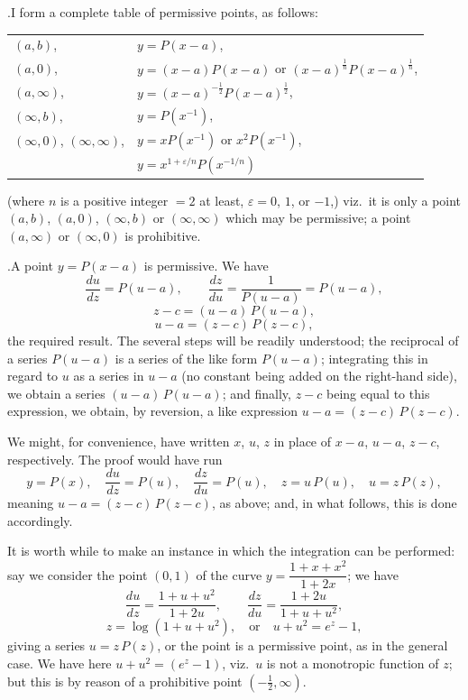 \documentclass[11pt]{article}
\begin{document}
\medskip

.\quad I form a complete table of permissive points, as follows:
\begin{center}
\begin{tabular}{ll}
$(a,b)$, & $y = P(x-a)$, \\
$(a,0)$, & $y = (x-a)P(x-a)$ or $(x-a)^{\frac{1}{n}}P(x-a)^{\frac{1}{n}}$, \\
$(a,\infty)$, & $y = (x-a)^{-\frac{1}{2}}P(x-a)^{\frac{1}{2}}$, \\
$(\infty,b)$, & $y = P(x^{-1})$, \\
$(\infty,0)$, $(\infty,\infty)$, & $y = xP(x^{-1})$ or $x^{2}P(x^{-1})$, \\
 & $y = x^{1+\varepsilon/n}P(x^{-1/n})$
\end{tabular}
\end{center}
\noindent (where $n$ is a positive integer $=2$ at least, $\varepsilon=0$, $1$, or $-1$,) viz.\ it is only a point $(a,b)$, $(a,0)$, $(\infty,b)$ or $(\infty,\infty)$ which may be permissive; a point $(a,\infty)$ or $(\infty,0)$ is prohibitive.

\medskip

.\quad A point $y = P(x-a)$ is permissive. We have
\[
\frac{du}{dz} = P(u-a), \qquad \frac{dz}{du} = \frac{1}{P(u-a)} = P(u-a),
\]
\[
z-c = (u-a)\,P(u-a),
\]
\[
u-a = (z-c)\,P(z-c),
\]
the required result. The several steps will be readily understood; the reciprocal of a series $P(u-a)$ is a series of the like form $P(u-a)$; integrating this in regard to $u$ as a series in $u-a$ (no constant being added on the right-hand side), we obtain a series $(u-a)\,P(u-a)$; and finally, $z-c$ being equal to this expression, we obtain, by reversion, a like expression $u-a = (z-c)\,P(z-c)$.

We might, for convenience, have written $x$, $u$, $z$ in place of $x-a$, $u-a$, $z-c$, respectively. The proof would have run
\[
y = P(x),\quad \frac{du}{dz} = P(u),\quad \frac{dz}{du} = P(u),\quad z = u\,P(u),\quad u = z\,P(z),
\]
meaning $u-a = (z-c)\,P(z-c)$, as above; and, in what follows, this is done accordingly.

It is worth while to make an instance in which the integration can be performed: say we consider the point $(0,1)$ of the curve $y = \dfrac{1+x+x^{2}}{1+2x}$; we have
\[
\frac{du}{dz} = \frac{1+u+u^{2}}{1+2u}, \qquad \frac{dz}{du} = \frac{1+2u}{1+u+u^{2}},
\]
\[
z = \log(1+u+u^{2}), \quad \text{or}\quad u+u^{2} = e^{z}-1,
\]
giving a series $u = z\,P(z)$, or the point is a permissive point, as in the general case. We have here $u+u^{2} = (e^{z}-1)$, viz.\ $u$ is not a monotropic function of $z$; but this is by reason of a prohibitive point $(-\tfrac{1}{2},\infty)$.
\end{document}
